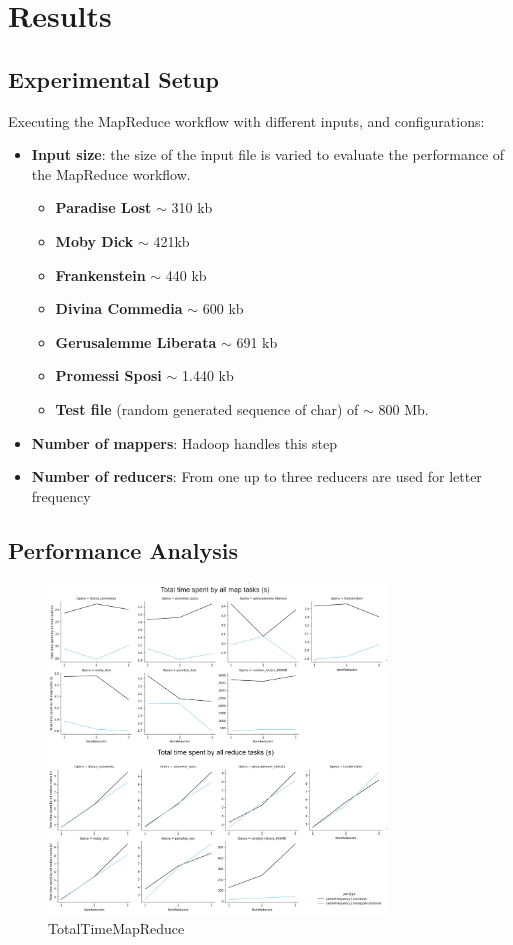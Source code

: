 \newpage
\section{Results}
\subsection{Experimental Setup}
Executing the MapReduce workflow with different inputs, and configurations:
\begin{itemize}
  \item \textbf{Input size}: the size of the input file is varied to evaluate the performance of the MapReduce workflow.
        \begin{itemize}
          \item \textbf{Paradise Lost} $\sim$ 310 kb
          \item \textbf{Moby Dick} $\sim$ 421kb
          \item \textbf{Frankenstein} $\sim$ 440 kb
          \item \textbf{Divina Commedia} $\sim$ 600 kb
          \item \textbf{Gerusalemme Liberata} $\sim$ 691 kb
          \item \textbf{Promessi Sposi} $\sim$ 1.440 kb
          \item \textbf{Test file} (random generated sequence of char) of $\sim$ 800 Mb.
        \end{itemize}
  \item \textbf{Number of mappers}: Hadoop handles this step
  \item \textbf{Number of reducers}: From one up to three reducers are used for letter frequency
\end{itemize}

\subsection{Performance Analysis}
  
\begin{figure}[H]
  \centering
  \includegraphics[width=0.8\textwidth]{media/performance/TotalTimeMapReduce.png}
  \caption{TotalTimeMapReduce}
  \label{fig:TotalTimeMapReduce}
\end{figure}


